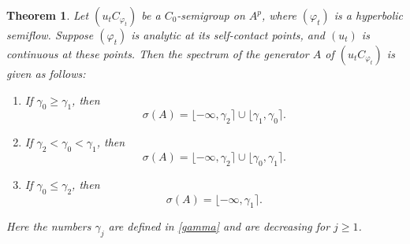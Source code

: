 \documentclass[10pt,a4paper]{amsart}
\newtheorem{theorem}{Theorem}
\begin{document}
\begin{theorem}\label{main}
Let $(u_tC_{\varphi_t})$ be a $C_0$-semigroup on $A^p$, where $(\varphi_t)$ is a hyperbolic semiflow. Suppose $(\varphi_t)$ is analytic at its self-contact points, and $(u_t)$ is continuous at these points. Then the spectrum of the generator $A$ of $(u_tC_{\varphi_t})$ is given as follows:
\begin{enumerate}
\item If $\gamma_0 \geq \gamma_1$, then
$$\sigma(A) = \lfloor-\infty, \gamma_2\rceil\cup\lfloor\gamma_1,\gamma_0\rceil.$$

\item If $\gamma_2 < \gamma_0 < \gamma_1$, then
$$\sigma(A) = \lfloor-\infty,  \gamma_2\rceil\cup\lfloor\gamma_0 ,\gamma_1\rceil.$$

\item If $\gamma_0 \leq \gamma_2$, then
$$\sigma(A) = \lfloor-\infty, \gamma_1\rceil.$$
\end{enumerate}
Here the numbers $\gamma_j$ are defined in \eqref{gamma} and are decreasing for $j\geq 1$.
\end{theorem}
\end{document}
